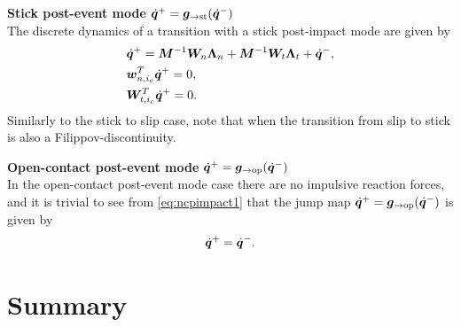 \documentclass[../DC2017114Bouma.tex]{subfiles}
\begin{document}
\textbf{Stick post-event mode} $\dot{{\boldsymbol{q}}}^+ = {\boldsymbol{g}}_{\rightarrow\text{st}}(\dot{{\boldsymbol{q}}}^-)$\\
The discrete dynamics of a transition with a stick post-impact mode are given by
\begin{align}
&\dot{{\boldsymbol{q}}}^+ = {\boldsymbol{M}}^{-1}{\boldsymbol{W}}_{n}\boldsymbol{\Lambda}_{n} + {\boldsymbol{M}}^{-1}{\boldsymbol{W}}_{t}\boldsymbol{\Lambda}_{t} + \dot{{\boldsymbol{q}}}^-,\label{eq:discstick1}\\
&{\boldsymbol{w}}^T_{n,i_c}\dot{{\boldsymbol{q}}}^+ = 0,\label{eq:discstick2}\\
&{\boldsymbol{W}}^T_{t,i_c}\dot{{\boldsymbol{q}}}^+ = 0.\label{eq:discstick3}
\end{align}
Similarly to the stick to slip case, note that when the transition from slip to stick is also a Filippov-discontinuity.

\textbf{Open-contact post-event mode} $\dot{{\boldsymbol{q}}}^+ = {\boldsymbol{g}}_{\rightarrow\text{op}}(\dot{{\boldsymbol{q}}}^-)$\\
In the open-contact post-event mode case there are no impulsive reaction forces, and it is trivial to see from \eqref{eq:ncpimpact1} that the jump map $\dot{{\boldsymbol{q}}}^+ = {\boldsymbol{g}}_{\rightarrow\text{op}}(\dot{{\boldsymbol{q}}}^-)$ is given by
\begin{align}
\dot{{\boldsymbol{q}}}^+ = \dot{{\boldsymbol{q}}}^-.\label{eq:gopen}
\end{align}

\section{Summary}
\end{document}
